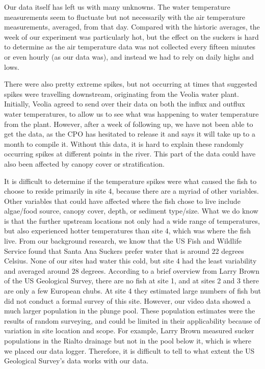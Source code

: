 \documentclass{article}
\begin{document}
Our data itself has left us with many unknowns. The water temperature measurements seem to fluctuate but not necessarily with the air temperature measurements, averaged, from that day. Compared with the historic averages, the week of our experiment was particularly hot, but the effect on the suckers is hard to determine as the air temperature data was not collected every fifteen minutes or even hourly (as our data was), and instead we had to rely on daily highs and lows. 

There were also pretty extreme spikes, but not occurring at times that suggested spikes were travelling downstream, originating from the Veolia water plant. Initially, Veolia agreed to send over their data on both the influx and outflux water temperatures, to allow us to see what was happening to water temperature from the plant. However, after a week of following up, we have not been able to get the data, as the CPO has hesitated to release it and says it will take up to a month to compile it. Without this data, it is hard to explain these randomly occurring spikes at different points in the river. This part of the data could have also been affected by canopy cover or stratification. 

It is difficult to determine if the temperature spikes were what caused the fish to choose to reside primarily in site 4, because there are a myriad of other variables. Other variables that could have affected where the fish chose to live include algae/food source, canopy cover, depth, or sediment type/size. What we do know is that the further upstream locations not only had a wide range of temperatures, but also experienced hotter temperatures than site 4, which was where the fish live. From our background research, we know that the US Fish and Wildlife Service found that Santa Ana Suckers prefer water that is around 22 degrees Celsius. None of our sites had water this cold, but site 4 had the least variability and averaged around 28 degrees. According to a brief overview from Larry Brown of the US Geological Survey, there are no fish at site 1, and at sites 2 and 3 there are only a few European chubs. At site 4 they estimated large numbers of fish but did not conduct a formal survey of this site. However, our video data showed a much larger population in the plunge pool. These population estimates were the results of random surveying, and could be limited in their applicability because of variation in site location and scope. For example, Larry Brown measured sucker populations in the Rialto drainage but not in the pool below it, which is where we placed our data logger. Therefore, it is difficult to tell to what extent the US Geological Survey’s data works with our data. 
\end{document}
